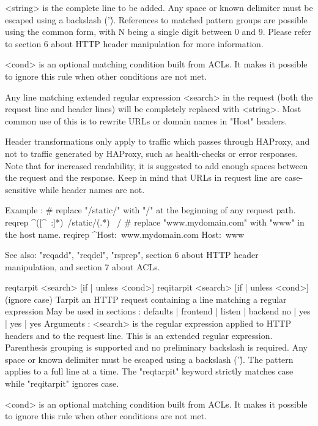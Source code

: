     <string>  is the complete line to be added. Any space or known delimiter
              must be escaped using a backslash ('\'). References to matched
              pattern groups are possible using the common \N form, with N
              being a single digit between 0 and 9. Please refer to section
              6 about HTTP header manipulation for more information.

    <cond>    is an optional matching condition built from ACLs. It makes it
              possible to ignore this rule when other conditions are not met.

  Any line matching extended regular expression <search> in the request (both
  the request line and header lines) will be completely replaced with <string>.
  Most common use of this is to rewrite URLs or domain names in "Host" headers.

  Header transformations only apply to traffic which passes through HAProxy,
  and not to traffic generated by HAProxy, such as health-checks or error
  responses. Note that for increased readability, it is suggested to add enough
  spaces between the request and the response. Keep in mind that URLs in
  request line are case-sensitive while header names are not.

  Example :
     # replace "/static/" with "/" at the beginning of any request path.
     reqrep ^([^\ :]*)\ /static/(.*)     \1\ /\2
     # replace "www.mydomain.com" with "www" in the host name.
     reqirep ^Host:\ www.mydomain.com   Host:\ www

  See also: "reqadd", "reqdel", "rsprep", section 6 about HTTP header
            manipulation, and section 7 about ACLs.


reqtarpit  <search> [{if | unless} <cond>]
reqitarpit <search> [{if | unless} <cond>]  (ignore case)
  Tarpit an HTTP request containing a line matching a regular expression
  May be used in sections :   defaults | frontend | listen | backend
                                 no    |    yes   |   yes  |   yes
  Arguments :
    <search>  is the regular expression applied to HTTP headers and to the
              request line. This is an extended regular expression. Parenthesis
              grouping is supported and no preliminary backslash is required.
              Any space or known delimiter must be escaped using a backslash
              ('\'). The pattern applies to a full line at a time. The
              "reqtarpit" keyword strictly matches case while "reqitarpit"
              ignores case.

    <cond>    is an optional matching condition built from ACLs. It makes it
              possible to ignore this rule when other conditions are not met.

